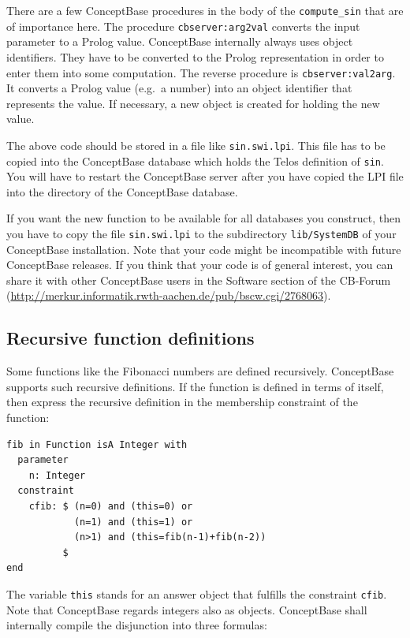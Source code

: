 There are a few ConceptBase procedures in the body of the  {\tt compute\_sin} that are of importance here.
The procedure {\tt cbserver:arg2val}  converts the input parameter to a Prolog value. ConceptBase 
internally always uses object identifiers. They have to be converted to the Prolog representation in
order to enter them into some computation. The reverse procedure is {\tt cbserver:val2arg}. It converts
a Prolog value (e.g.\ a number) into an object identifier that represents the value. If necessary, a new
object is created for holding the new value.

The above code should be stored in a file like {\tt sin.swi.lpi}. This file has to be
copied into the ConceptBase database which holds the Telos definition of {\tt sin}.
You will have to restart the ConceptBase server after you have copied the LPI file into the
directory of the ConceptBase database.

If you want the new function to be available for all databases you construct, then you
have to copy the file  {\tt sin.swi.lpi} to the subdirectory {\tt lib/SystemDB} of your ConceptBase installation.
Note that your code might be incompatible with future ConceptBase releases. If you think that your code is
of general interest, you can share it with other ConceptBase users in the Software section
of the CB-Forum
(\url{http://merkur.informatik.rwth-aachen.de/pub/bscw.cgi/2768063}).


\subsection{Recursive function definitions}

Some functions like the Fibonacci numbers are defined recursively. ConceptBase supports
such recursive definitions. If the function is defined in terms of itself, then 
express the recursive definition in the membership constraint of the function:

{\small
\begin{verbatim}
fib in Function isA Integer with
  parameter
    n: Integer
  constraint
    cfib: $ (n=0) and (this=0) or
            (n=1) and (this=1) or
            (n>1) and (this=fib(n-1)+fib(n-2))
          $
end
\end{verbatim}
}

The variable {\tt this} stands for an answer object that fulfills the constraint {\tt cfib}.
Note that ConceptBase regards integers also as objects.
ConceptBase shall internally compile the disjunction into three formulas:

